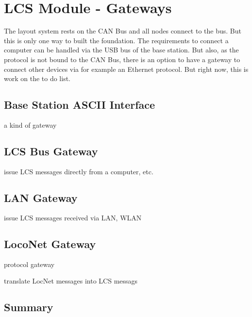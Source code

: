 \chapter{LCS Module - Gateways}

The layout system rests on the CAN Bus and all nodes connect to the bus. But this is only one way to built the foundation. The requirements to connect a computer can be handled via the USB bus of the base station. But also, as the protocol is not bound to the CAN Bus, there is an option to have a gateway to connect other devices via for example an Ethernet protocol. But right now, this is work on the to do list.

\section{Base Station ASCII Interface}

a kind of gateway

\section{LCS Bus Gateway}

issue LCS messages directly from a computer, etc.

\section{LAN Gateway}

issue LCS messages received via LAN, WLAN

\section{LocoNet Gateway}

protocol gateway

translate LocNet messages into LCS messags

\section{Summary}

